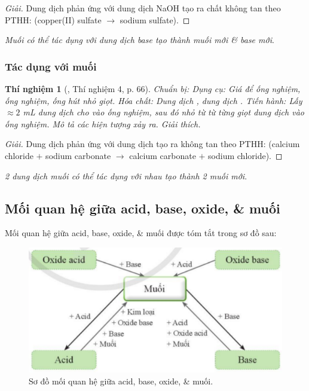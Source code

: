 \documentclass{article}
\newtheorem{thinghiem}{Thí nghiệm}
\begin{document}
\begin{proof}[Giải]
	Dung dịch  phản ứng với dung dịch NaOH tạo ra chất không tan  theo PTHH:  (copper(II) sulfate $\to$ sodium sulfate).
\end{proof}
\textit{Muối có thể tác dụng với dung dịch base tạo thành muối mới \& base mới}.

\subsubsection{Tác dụng với muối}

\begin{thinghiem}[\cite{SGK_KHTN_8_Canh_Dieu}, Thí nghiệm 4, p. 66]
	{\rm Chuẩn bị:} Dụng cụ: Giá để ống nghiệm, ống nghiệm, ống hút nhỏ giọt. Hóa chất: Dung dịch {\rm{}}, dung dịch {\rm{}}. {\rm Tiến hành:} Lấy $\approx2$ {\rm mL} dung dịch {\rm{}} cho vào ống nghiệm, sau đó nhỏ từ từ từng giọt dung dịch {\rm{}} vào ống nghiệm. Mô tả các hiện tượng xảy ra. Giải thích.
\end{thinghiem}

\begin{proof}[Giải]
	Dung dịch  phản ứng với dung dịch  tạo ra  không tan theo PTHH:  (calcium chloride $+$ sodium carbonate $\to$ calcium carbonate $+$ sodium chloride).
\end{proof}
\textit{2 dung dịch muối có thể tác dụng với nhau tạo thành 2 muối mới}.

\subsection{Mối quan hệ giữa acid, base, oxide, \& muối}
Mối quan hệ giữa acid, base, oxide, \& muối được tóm tắt trong sơ đồ sau:
\begin{figure}[H]
	\centering
	\includegraphics[scale=0.3]{acid_base_oxide_salt}
	\caption{Sơ đồ mối quan hệ giữa acid, base, oxide, \& muối.}
	\label{fig:acid_base_oxide_salt}
\end{figure}
\end{document}
